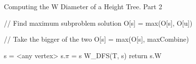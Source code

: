 \begin{algorithm}{}
\caption{Computing the W Diameter of a Height Tree. Part 2}
\begin{algorithmic}[1]

    \State // Find maximum subproblem solution
        \State O[s] = max(O[s], O[u])
    \EndFor

    \State // Take the bigger of the two
    \State O[s] = max(O[s], maxCombine)


    \State s = <any vertex>
    \State s.$\pi$ = s
    \State W\_DFS(T, s)
    \State return s.W
\EndFunction

\end{algorithmic}
\end{algorithm}











